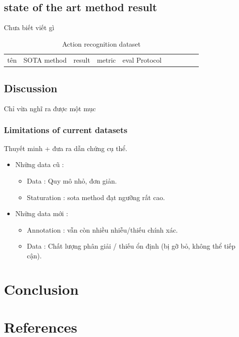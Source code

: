 \documentclass[a4paper]{article}
\begin{document}
\subsection{state of the art method result}

Chưa biết viết gì

\begin{table}[h]
	\centering
	\caption{Action recognition dataset}
	\begin{tabular}{l|l l l l l l l l l}
		\toprule
		tên & SOTA method & result & metric & eval Protocol \\
	\end{tabular}%
	\label{config4}
\end{table}%

\subsection{Discussion}

Chỉ vừa nghĩ ra được một mục

\subsubsection{Limitations of current datasets}

Thuyết minh + đưa ra dẫn chứng cụ thể.

\begin{itemize}
	\item Những data cũ :
	\begin{itemize}
		\item Data : Quy mô nhỏ, đơn giản.
		\item Staturation : sota method đạt ngưỡng rất cao.
	\end{itemize}
	
	\item Những data mới :
	\begin{itemize}
		\item Annotation : vẫn còn nhiều nhiễu/thiếu chính xác.
		\item Data : Chất lượng phân giải / thiếu ổn định (bị gỡ bỏ, không thể tiếp cận).
	\end{itemize}
	
\end{itemize}

\section{Conclusion}

\section{References}
\end{document}
